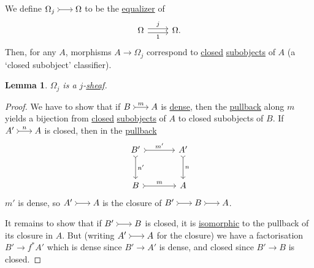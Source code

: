 \documentclass{article}
\newenvironment{tikzcdi}{\begin{tikzcd}[cramped, sep=scriptsize]}{\end{tikzcd}}
\newtheorem{nlemma}[nthm]{Lemma}
\begin{document}
We define $\begin{tikzcdi}\Omega_j \rar[tail] & \Omega\end{tikzcdi}$ to be the \hyperlink{def:equalizer}{equalizer} of
\begin{equation*}
  \begin{tikzcd}
    \Omega \rar[shift left]{j} \rar[shift right,']{1} & \Omega.
  \end{tikzcd}
\end{equation*}
Then, for any $A$, morphisms $A \to \Omega_j$ correspond to \hyperlink{def:denseclosed}{closed} \hyperlink{def:subobj}{subobjects} of $A$ (a `closed subobject' classifier).

\begin{nlemma}\label{lem:7.21}
  $\Omega_j$ is a $j$-\hyperlink{def:sheaf}{sheaf}.
\end{nlemma}
\begin{proof}
  We have to show that if $\begin{tikzcdi}B \rar[tail]{m} & A\end{tikzcdi}$ is \hyperlink{def:denseclosed}{dense}, then the \hyperlink{def:pullback}{pullback} along $m$ yields a bijection from \hyperlink{def:denseclosed}{closed} \hyperlink{def:subobj}{subobjects} of $A$ to closed subobjects of $B$.
  If $\begin{tikzcdi}A' \rar[tail]{n} & A\end{tikzcdi}$ is closed, then in the \hyperlink{def:pullback}{pullback}
  \begin{equation*}
    \begin{tikzcd}[sep=large]
      B' \rar[tail]{m'} \dar[tail]{n'} & A' \dar[tail]{n} \\
      B \rar[tail]{m} & A
    \end{tikzcd}
  \end{equation*}
  $m'$ is dense, so $\begin{tikzcdi}A' \rar[tail] & A\end{tikzcdi}$ is the closure of $\begin{tikzcdi}B' \rar[tail] & B \rar[tail] & A\end{tikzcdi}$.

  It remains to show that if $\begin{tikzcdi}B' \rar[tail] & B\end{tikzcdi}$ is closed, it is \hyperlink{def:iso}{isomorphic} to the pullback of its closure in $A$.
  But (writing $\begin{tikzcdi}A'\rar[tail] & A\end{tikzcdi}$ for the closure) we have a factorisation $B' \to f^* A'$ which is dense since $B' \to A'$ is dense, and closed since $B' \to B$ is closed.
\end{proof}
\end{document}
